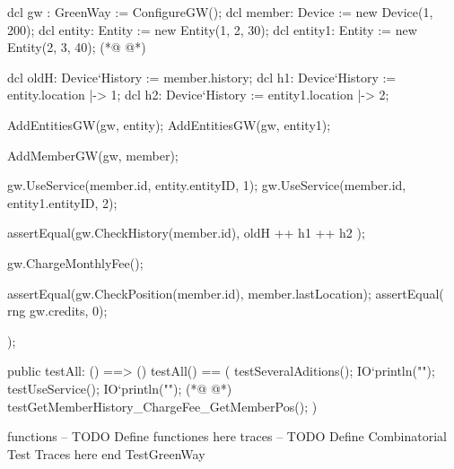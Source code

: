 \begin{vdmpp}
   dcl gw : GreenWay := ConfigureGW();   
   dcl member: Device := new Device(1, 200);
   dcl entity: Entity := new Entity(1, 2, 30);
   dcl entity1: Entity := new Entity(2, 3, 40);
(*@
\label{testGetMemberHistory:126}
@*)
   
   dcl oldH: Device`History := member.history;
   dcl h1: Device`History := {entity.location |-> 1}; 
   dcl h2: Device`History := {entity1.location |-> 2}; 
   
   AddEntitiesGW(gw, entity); 
   AddEntitiesGW(gw, entity1);
    
    AddMemberGW(gw, member); 
   
   gw.UseService(member.id, entity.entityID, 1);
   gw.UseService(member.id, entity1.entityID, 2);   
   
   assertEqual(gw.CheckHistory(member.id), oldH ++ h1 ++ h2 );   
   
   gw.ChargeMonthlyFee();  
   
   assertEqual(gw.CheckPosition(member.id), member.lastLocation); 
   assertEqual( rng gw.credits, {0}); 
   
   );
  
  public testAll: () ==> ()
  testAll() == ( 
    testSeveralAditions();
    IO`println("");
    testUseService();
    IO`println("");
(*@
\label{testAll:154}
@*)
    testGetMemberHistory_ChargeFee_GetMemberPos();
    )
       
functions
-- TODO Define functiones here
traces
-- TODO Define Combinatorial Test Traces here
end TestGreenWay
\end{vdmpp}
\bigskip
